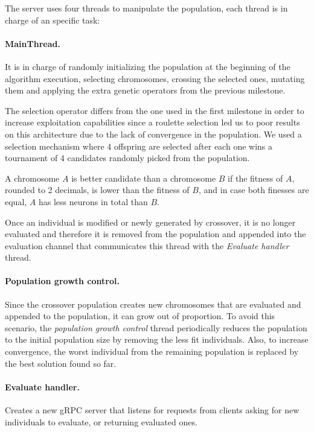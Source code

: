 The server uses four threads to manipulate the population, each thread is in charge of an specific task:

\paragraph*{MainThread.} It is in charge of randomly initializing the population at the beginning of the algorithm execution, selecting chromosomes, crossing the selected ones, mutating them and applying the extra genetic operators from the previous milestone.

The selection operator differs from the one used in the first milestone in order to increase exploitation capabilities since a roulette selection led us to poor results on this architecture due to the lack of convergence in the population. We used a selection mechanism where 4 offspring are selected after each one wins a tournament of 4 candidates randomly picked from the population.

A chromosome $A$ is better candidate than a chromosome $B$ if the fitness of $A$, rounded to 2 decimals, is lower than the fitness of $B$, and in case both finesses are equal, $A$ has less neurons in total than $B$.

Once an individual is modified or newly generated by crossover, it is no longer evaluated and therefore it is removed from the population and appended into the evaluation channel that communicates this thread with the \textit{Evaluate handler} thread.

\paragraph*{Population growth control.} Since the crossover population creates new chromosomes that are evaluated and appended to the population, it can grow out of proportion. To avoid this scenario, the \textit{population growth control} thread periodically reduces the population to the initial population size by removing the less fit individuals. Also, to increase convergence, the worst individual from the remaining population is replaced by the best solution found so far.
	
\paragraph*{Evaluate handler.} Creates a new gRPC server that listens for requests from clients asking for new individuals to evaluate, or returning evaluated ones. 

